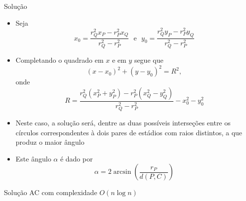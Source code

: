 \begin{frame}[fragile]{Solução}

    \begin{itemize}
        \item Seja
        \[
            x_0 = \frac{r_Q^2x_P - r_P^2x_Q}{r_Q^2 - r_P^2}\ \ \ \mbox{e}\ \ \ 
            y_0 = \frac{r_Q^2y_P - r_P^2y_Q}{r_Q^2 - r_P^2}
        \]

        \item Completando o quadrado em $x$ e em $y$ segue que
        \[
            (x - x_0)^2 + (y - y_0)^2 = R^2,
        \]
        onde
        \[
            R = \frac{r_Q^2(x_P^2 + y_P^2) - r_P^2(x_Q^2 - y_Q^2)}{r_Q^2 - r_P^2} - x_0^2 - y_0^2
        \]

        \item Neste caso, a solução será, dentre as duas possíveis interseções entre os 
            círculos correspondentes à dois pares de estádios com raios distintos, a que 
            produz o maior ângulo

        \item Este ângulo $\alpha$ é dado por
        \[
            \alpha = 2\arcsin\left(\frac{r_P}{d(P, C)}\right)
        \]
    \end{itemize}

\end{frame}
\begin{frame}[fragile]{Solução AC com complexidade $O(n \log n)$}
\end{frame}

